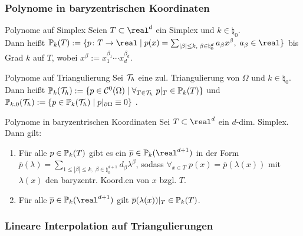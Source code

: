 \subsubsection{%
    Polynome in baryzentrischen Koordinaten%
}

\begin{Def}{Polynome auf Simplex}
    Seien $T \subset \real^d$ ein Simplex und $k \in \natural_0$.\\
    Dann heißt $\PP_k(T) := \{p\colon T \to \real \;|\;
    p(x) = \sum_{|\beta| \le k,\; \beta \in \natural_0^d} a_\beta x^\beta,\; a_\beta \in \real\}$
     bis Grad $k$ auf $T$,
    wobei $x^\beta := x_1^{\beta_1} \dotsm x_d^{\beta_d}$.
\end{Def}

\begin{Def}{Polynome auf Triangulierung}
    Sei $\mathcal{T}_h$ eine zul. Triangulierung von $\Omega$ und $k \in \natural_0$.\\
    Dann heißt
    $\mathbb{P}_k(\mathcal{T}_h) := \{p \in \mathcal{C}^0(\Omega) \;|\; \forall_{T \in \mathcal{T}_h}\; p|_T \in \mathbb{P}_k(T)\}$
     und
    $\mathbb{P}_{k,0}(\mathcal{T}_h) := \{p \in \mathbb{P}_k(\mathcal{T}_h) \;|\; p|_{\partial\Omega} \equiv 0\}$
    .
\end{Def}

\linie

\begin{Lemma}{Polynome in baryzentrischen Koordinaten}
    Sei $T \subset \real^d$ ein $d$-dim. Simplex.
    Dann gilt:
    \begin{enumerate}
        \item
        Für alle $p \in \mathbb{P}_k(T)$ gibt es ein $\overline{p} \in \PP_k(\real^{d+1})$
        in der Form $\overline{p}(\lambda) = \sum_{1 \le |\beta| \le k,\;
        \beta \in \natural_0^{d+1}} d_\beta \lambda^\beta$, sodass
        $\forall_{x \in T}\; p(x) = \overline{p}(\lambda(x))$ mit
        $\lambda(x)$ den baryzentr. Koord.en von $x$ bzgl. $T$.
        
        \item
        Für alle $\overline{p} \in \PP_k(\real^{d+1})$ gilt
        $\overline{p}(\lambda(x))|_T \in \mathbb{P}_k(T)$.
    \end{enumerate}
\end{Lemma}

\pagebreak

\subsubsection{%
    Lineare Interpolation auf Triangulierungen%
}

